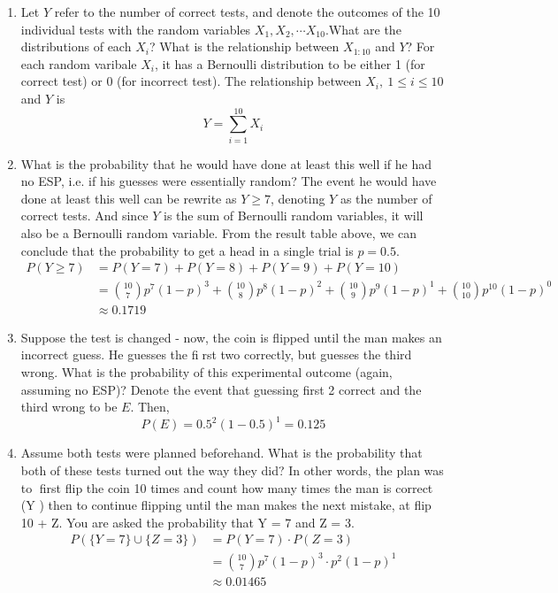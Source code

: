 \documentclass[preprint,12pt]{elsarticle}
\begin{document}
    \begin{enumerate}[label=\alph*]
    \item Let $Y$ refer to the number of correct tests, and denote the outcomes of the 10 individual tests
    with the random variables $X_1,X_2, \cdots X_10$.What are the distributions of each $X_i$? What is the 
    relationship between $X_{1:10}$ and $Y$?
    For each random varibale $X_i$, it has a Bernoulli distribution to be either 1 (for correct test) or 0
    (for incorrect test). The relationship between $X_i,\ 1\leq i\leq 10$ and $Y$ is 
    \begin{equation*}
        Y = \sum_{i=1}^{10} X_i
    \end{equation*}

    \item What is the probability that he would have done at least this well if he had no ESP, i.e. if his guesses
    were essentially random?
    The event he would have done at least this well can be rewrite as $Y \geq 7$, denoting $Y$ as the number of 
    correct tests. And since $Y$ is the sum of Bernoulli random variables, it will also be a Bernoulli random variable.
    From the result table above, we can conclude that the probability to get a head in a single trial is $p = 0.5$.
    \begin{align*}
        P(Y \geq 7)     &= P(Y=7) + P(Y=8) + P(Y=9) + P(Y=10) \\
                        &= \binom{10}{7}p^7(1-p)^3 + \binom{10}{8}p^8(1-p)^2
                           + \binom{10}{9}p^9(1-p)^1 + \binom{10}{10}p^10(1-p)^0 \\
                        &\approx 0.1719
    \end{align*}

    \item Suppose the test is changed - now, the coin is flipped until the man makes an incorrect guess.
    He guesses the first two correctly, but guesses the third wrong. What is the probability of this
    experimental outcome (again, assuming no ESP)?
    Denote the event that guessing first 2 correct and the third wrong to be $E$. Then,
    \begin{equation*}
        P(E) = 0.5^2 (1-0.5)^1 = 0.125
    \end{equation*}

    \item Assume both tests were planned beforehand. What is the probability that both of these tests turned
    out the way they did? In other words, the plan was to first flip the coin 10 times and count how many times 
    the man is correct (Y ) then to continue flipping until the man makes the next mistake, at flip 10 + Z. 
    You are asked the probability that Y = 7 and Z = 3.
    \begin{align*}
        P(\{Y=7\}\cup \{Z=3\})  &= P(Y=7) \cdot P(Z=3) \\
                            &= \binom{10}{7}p^7(1-p)^3 \cdot p^2 (1-p)^1 \\
                            &\approx 0.01465
    \end{align*}
    \end{enumerate}
\end{document}
